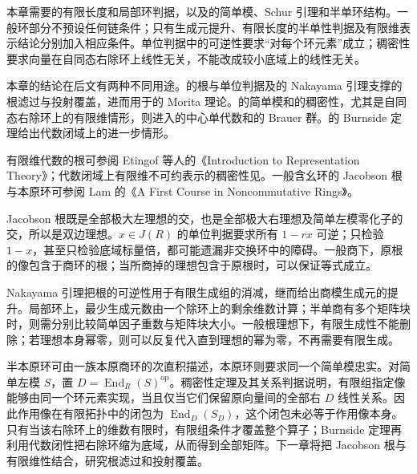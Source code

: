 \ProseParagraphBreak

本章需要的有限长度和局部环判据，以及的简单模、Schur 引理和半单环结构。一般环部分不预设任何链条件；只有生成元提升、有限长度的半单性判据及有限维表示结论分别加入相应条件。单位判据中的可逆性要求“对每个环元素”成立；稠密性要求向量在自同态右除环上线性无关，不能改成较小底域上的线性无关。

\ProseParagraphBreak
本章的结论在后文有两种不同用途。的根与单位判据及的 Nakayama 引理支撑的根滤过与投射覆盖，进而用于的 Morita 理论。的简单模和的稠密性，尤其是自同态右除环上的有限维情形，则进入的中心单代数和的 Brauer 群。的 Burnside 定理给出代数闭域上的进一步情形。

\ProseParagraphBreak
有限维代数的根可参阅 Etingof 等人的《Introduction to Representation Theory》\cite[Section 3.5, Definition 3.5.1, Proposition 3.5.2, p. 46]{EtingofEtAl2011RepresentationTheory}；代数闭域上有限维不可约表示的稠密性见\cite[Section 3.2, Corollary 3.2.1, Theorem 3.2.2(i), p. 43]{EtingofEtAl2011RepresentationTheory}。一般含幺环的 Jacobson 根与本原环可参阅 Lam 的《A First Course in Noncommutative Rings》\cite[Chapters 2 and 4]{Lam2001NoncommutativeRings}。







\begin{chaptersummary}
	Jacobson 根既是全部极大左理想的交，也是全部极大右理想及简单左模零化子的交，所以是双边理想。\(x\in J(R)\) 的单位判据要求所有 \(1-rx\) 可逆；只检验 \(1-x\)，甚至只检验底域标量倍，都可能遗漏非交换环中的障碍。一般商下，原根的像包含于商环的根；当所商掉的理想包含于原根时，可以保证等式成立。

	\ProseParagraphBreak
	Nakayama 引理把根的可逆性用于有限生成组的消减，继而给出商模生成元的提升。局部环上，最少生成元数由一个除环上的剩余维数计算；半单商有多个矩阵块时，则需分别比较简单因子重数与矩阵块大小。一般根理想下，有限生成性不能删除；若理想本身幂零，则可以反复代入直到理想的幂为零，不再需要有限生成。

	\ProseParagraphBreak
	半本原环可由一族本原商环的次直积描述，本原环则要求同一个简单模忠实。对简单左模 \(S\)，置 \(D=\operatorname{End}_R(S)^{\mathrm{op}}\)。稠密性定理及其关系判据说明，有限组指定像能够由同一个环元素实现，当且仅当它们保留原向量间的全部右 \(D\) 线性关系。因此作用像在有限拓扑中的闭包为 \(\operatorname{End}_D(S_D)\)，这个闭包未必等于作用像本身。只有当该右除环上的维数有限时，有限组条件才覆盖整个算子；Burnside 定理再利用代数闭性把右除环缩为底域，从而得到全部矩阵。下一章将把 Jacobson 根与有限维性结合，研究根滤过和投射覆盖。
\end{chaptersummary}

